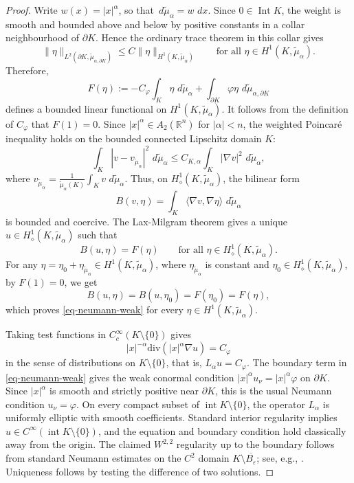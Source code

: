 \documentclass[12pt,leqno]{amsart}
\theoremstyle{plain} \newtheorem{thm}{Theorem}[section]
\theoremstyle{plain} \newtheorem{prop}[thm]{Proposition}
\theoremstyle{plain} \newtheorem{prob}[thm]{Problem}
\theoremstyle{definition} \newtheorem{defi}[thm]{Definition}
\theoremstyle{plain} \newtheorem{cor}[thm]{Corollary}
\theoremstyle{plain} \newtheorem{lem}[thm]{Lemma}
\theoremstyle{plain} \newtheorem{eg}{Example}[section]
\theoremstyle{remark} \newtheorem{rmk}[thm]{Remark}
\theoremstyle{plain} \newtheorem{conj}{Conjecture}
\numberwithin{equation}{section}
\newcommand{\divg}{\mathrm{div}}
\newcommand{\dd}{\,d}
\begin{document}
\begin{proof}
  Write $w(x)=|x|^\alpha$, so that
  $\dd\tilde{\mu}_\alpha=w\,\dd x$. Since $0\in\operatorname{Int}K$,
  the weight is smooth and bounded above and below by positive
  constants in a collar neighbourhood of $\partial K$. Hence the
  ordinary trace theorem in this collar gives
  \begin{equation}\label{eq-trace-estimate-tilde}
    \|\eta\|_{L^2(\partial K,\tilde{\mu}_{\alpha,\partial K})}
    \le C\|\eta\|_{H^1(K,\tilde{\mu}_\alpha)}
    \qquad
    \text{for all }\eta\in H^1(K,\tilde{\mu}_\alpha).
  \end{equation}
  Therefore,
  \[
    F(\eta):=
    -C_\varphi\int_K\eta\,\dd\tilde{\mu}_\alpha
    +
    \int_{\partial K}\varphi\eta\,
    \dd\tilde{\mu}_{\alpha,\partial K}
  \]
  defines a bounded linear functional on
  $H^1(K,\tilde{\mu}_\alpha)$. It follows from the definition of $C_\varphi$ that $F(1)=0$.
  Since $|x|^\alpha\in A_2(\mathbb R^n)$ for $|\alpha|<n$, the weighted
  Poincar\'e inequality holds on the bounded connected Lipschitz domain
  $K$:
  \begin{equation}\label{eq-wpoincare-tilde}
    \int_K |v-v_{\tilde{\mu}_\alpha}|^2
    \,\dd\tilde{\mu}_\alpha
    \le
    C_{K,\alpha}
    \int_K |\nabla v|^2\,\dd\tilde{\mu}_\alpha ,
  \end{equation}
  where $ v_{\tilde{\mu}_\alpha}
    =
    \frac1{\tilde{\mu}_\alpha(K)}
    \int_K v\,\dd\tilde{\mu}_\alpha$.
  Thus, on $H^1_\diamond(K,\tilde{\mu}_\alpha)$, the bilinear form
  \[
    B(v,\eta)
    =\int_K\langle\nabla v,\nabla\eta\rangle
    \,\dd\tilde{\mu}_\alpha
  \]
  is bounded and coercive. The Lax-Milgram theorem gives a unique
  $u\in H^1_\diamond(K,\tilde{\mu}_\alpha)$ such that
  \[
    B(u,\eta)=F(\eta)
    \qquad
    \text{for all }\eta\in H^1_\diamond(K,\tilde{\mu}_\alpha).
  \]
    For any $\eta=\eta_0+\eta_{\tilde{\mu}_\alpha}\in H^1(K,\tilde{\mu}_\alpha)$, where $\eta_{\tilde{\mu}_\alpha}$ is constant and $\eta_0\in H^1_\diamond(K,\tilde{\mu}_\alpha)$, by $F(1)=0$, we get
  \[
    B(u,\eta)=B(u,\eta_0)=F(\eta_0)=F(\eta),
  \]
  which proves \eqref{eq-neumann-weak} for every
  $\eta\in H^1(K,\tilde{\mu}_\alpha)$.

  Taking test functions in $C_c^\infty(K\setminus\{0\})$ gives
  \[
    |x|^{-\alpha}\divg(|x|^\alpha\nabla u)=C_\varphi
  \]
  in the sense of distributions on $K\setminus\{0\}$, that is,
  $L_\alpha u=C_\varphi$. The boundary term in
  \eqref{eq-neumann-weak} gives the weak conormal condition
  $|x|^\alpha u_\nu=|x|^\alpha\varphi$ on $\partial K$. Since
  $|x|^\alpha$ is smooth and strictly positive near $\partial K$, this
  is the usual Neumann condition $u_\nu=\varphi$.
  On every compact subset of $\operatorname{int}K\setminus\{0\}$, the operator
  $L_\alpha$ is uniformly elliptic with smooth coefficients. Standard
  interior regularity implies \(u\in C^\infty(\operatorname{int}K\setminus\{0\})\),
  and the equation and boundary condition hold classically away from
  the origin. The claimed $W^{2,2}$ regularity up to the boundary
  follows from standard Neumann estimates on the $C^2$ domain
  $K\setminus\overline{B_\varepsilon}$; see, e.g., \cite{Lie13}.
  Uniqueness follows by testing the difference of two solutions.


\end{proof}
\end{document}
